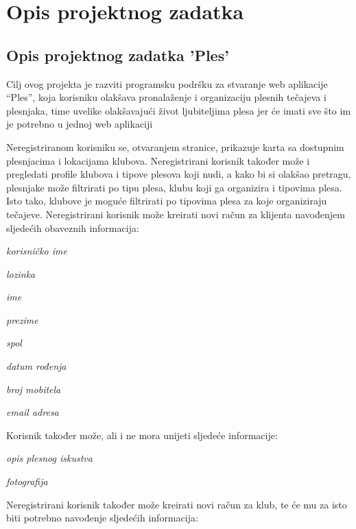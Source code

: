 \chapter{Opis projektnog zadatka}

\section{Opis projektnog zadatka 'Ples'}

\noindent Cilj ovog projekta je razviti programsku podršku za stvaranje web aplikacije “Ples”, koja korisniku olakšava pronalaženje i organizaciju plesnih tečajeva i plesnjaka, time uvelike olakšavajući život ljubiteljima plesa jer će imati sve što im je potrebno u jednoj web aplikaciji

\noindent Neregistriranom korisniku se, otvaranjem stranice, prikazuje karta sa dostupnim plesnjacima i lokacijama klubova. Neregistrirani korisnik također može i pregledati profile klubova i tipove plesova koji nudi, a kako bi si olakšao pretragu, plesnjake može filtrirati po tipu plesa, klubu koji ga organizira i tipovima plesa. Isto tako, klubove je moguće filtrirati po tipovima plesa za koje organiziraju tečajeve. 
	Neregistrirani korisnik može kreirati novi račun za klijenta navođenjem sljedećih obaveznih informacija:

\begin{packed_item}
	\item \textit{korisničko ime}
	\item \textit{lozinka}
	\item \textit{ime}
	\item \textit{prezime}
	\item \textit{spol}
	\item \textit{datum rođenja}
	\item \textit{broj mobitela}
	\item \textit{email adresa}
\end{packed_item}

\noindent Korisnik također može, ali i ne mora unijeti sljedeće informacije:

\begin{packed_item}
	\item \textit{opis plesnog iskustva}
	\item \textit{fotografija}
\end{packed_item}

\noindent Neregistrirani korisnik također može kreirati novi račun za klub, te će mu za isto biti potrebno navođenje sljedećih informacija:

